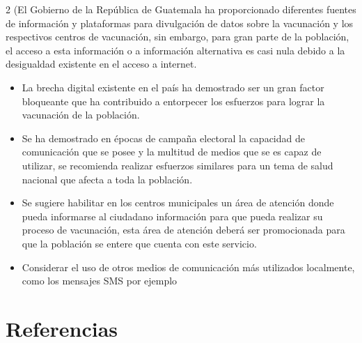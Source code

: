 \documentclass[12pt,spanish,Letterpaper,openany]{book}
\begin{document}
\begin {multicols}{2}
(El Gobierno de la República de Guatemala ha proporcionado diferentes fuentes de
información y plataformas para divulgación de datos sobre la vacunación y los
respectivos centros de vacunación, sin embargo, para gran parte de la población, el
acceso a esta información o a información alternativa es casi nula debido a la
desigualdad existente en el acceso a internet.

\begin{itemize}
\item
  La brecha digital existente en el país ha demostrado ser un gran factor bloqueante que ha
  contribuido a entorpecer los esfuerzos para lograr la vacunación de la población.
\item
  Se ha demostrado en épocas de campaña electoral la capacidad de comunicación que se
  posee y la multitud de medios que se es capaz de utilizar, se recomienda realizar esfuerzos
  similares para un tema de salud nacional que afecta a toda la población.
\item
  Se sugiere habilitar en los centros municipales un área de atención donde pueda informarse
  al ciudadano información para que pueda realizar su proceso de vacunación, esta área de
  atención deberá ser promocionada para que la población se entere que cuenta con este
  servicio.
\item
  Considerar el uso de otros medios de comunicación más utilizados localmente, como los
  mensajes SMS por ejemplo
\end{itemize}

\hypertarget{referencias-11}{%
\section{Referencias}\label{referencias-11}}


\end{multicols}
\end{document}
